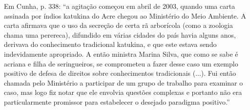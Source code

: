 Em Cunha, p. 338: \enquote{a agitação começou em abril de 2003, quando uma carta assinada por índios katukina do Acre chegou ao Ministério do Meio Ambiente. A carta afirmava que o uso da secreção de certa rã arborícola (como a zoologia chama uma perereca), difundido em várias cidades do país havia alguns anos, derivava do conhecimento tradicional katukina, e que este estava sendo indevidamente apropriado. A então ministra Marina Silva, que como se sabe é acriana e filha de seringueiros, se comprometeu a fazer desse caso um exemplo positivo de defesa de direitos sobre conhecimentos tradicionais (...). Fui então chamada pelo Ministério a participar de um grupo de trabalho para examinar o caso, mas logo fiz notar que ele envolvia questões complexas e portanto não era particularmente promissor para estabelecer o desejado paradigma positivo.}